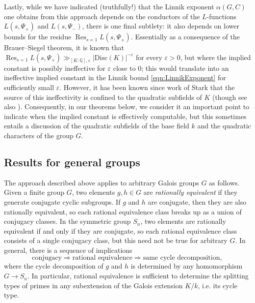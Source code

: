 \documentclass[12pt]{amsart}
\theoremstyle{definition} \newtheorem{definition}[theorem]{Definition}
\theoremstyle{example} \newtheorem{example}[theorem]{Example}
\theoremstyle{remark} \newtheorem{remark}{Remark}[theorem]
\numberwithin{equation}{section}
\numberwithin{theorem}{section}
\renewcommand{\epsilon}{\varepsilon}
\newcommand{\Res}{\mathop{\mathrm{Res}}}
\begin{document}
	Lastly, while we have indicated (truthfully!) that the Linnik exponent $\alpha(G,C)$ one obtains from this approach depends on the conductors of the $L$-functions $L(s,\Psi_+)$ and $L(s,\Psi_-)$, there is one final subtlety: it also depends on lower bounds for the residue $\Res_{s=1}L(s,\Psi_+)$.  Essentially as a consequence of the Brauer--Siegel theorem, it is known that $\Res_{s=1}L(s,\Psi_+) \gg_{[K:\mathbb{Q}],\epsilon} |\mathrm{Disc}(K)|^{-\epsilon}$ for every $\epsilon > 0$, but where the implied constant is possibly ineffective for $\epsilon$ close to $0$; this would translate into an ineffective implied constant in the Linnik bound \eqref{eqn:LinnikExponent} for sufficiently small $\epsilon$.  However, it has been known since work of Stark \cite{Stark-EffectiveBrauerSiegel} that the source of this ineffectivity is confined to the quadratic subfields of $K$ (though see also \cite{CLOZ}).  Consequently, in our theorems below, we consider it an important point to indicate when the implied constant is effectively computable, but this sometimes entails a discussion of the quadratic subfields of the base field $k$ and the quadratic characters of the group $G$.

	
	
\subsection{Results for general groups} \label{subsec:results-general-groups}
	
	The approach described above applies to arbitrary Galois groups $G$ as follows.  Given a finite group $G$, two elements $g,h \in G$ are \emph{rationally equivalent} if they generate conjugate cyclic subgroups.  If $g$ and $h$ are conjugate, then they are also rationally equivalent, so each rational equivalence class breaks up as a union of conjugacy classes.  In the symmetric group $S_n$, two elements are rationally equivalent if and only if they are conjugate, so each rational equivalence class consists of a single conjugacy class, but this need not be true for arbitrary $G$.  In general, there is a sequence of implications
		\[
			\text{conjugacy} \Longrightarrow \text{rational equivalence} \Longrightarrow \text{same cycle decomposition},
		\]
	where the cycle decomposition of $g$ and $h$ is determined by any homomorphism $G \to S_n$.  In particular, rational equivalence is sufficient to determine the splitting types of primes in any subextension of the Galois extension $K/k$, i.e. its cycle type.  
	
\end{document}
